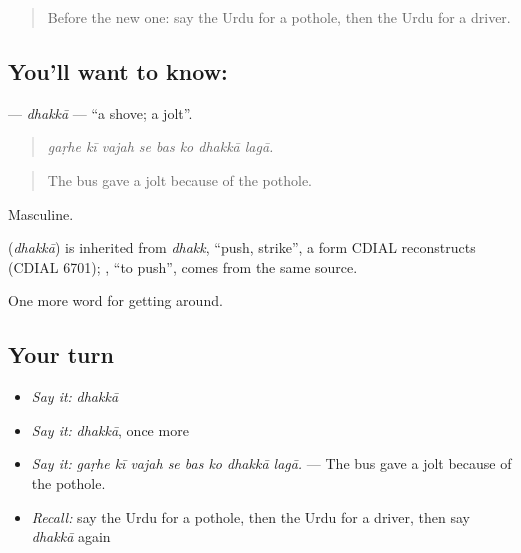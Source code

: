 \begin{quote}
Before the new one: say the Urdu for a pothole, then the Urdu for a driver.
\end{quote}

\subsection*{You'll want to know: }
\textbf{} — \emph{dhakkā} — \textquotedblleft{}a shove; a jolt\textquotedblright{}.

\begin{quote}
       
\end{quote}

\begin{quote}
\emph{gaṛhe kī vajah se bas ko dhakkā lagā.}
\end{quote}

\begin{quote}
The bus gave a jolt because of the pothole.
\end{quote}

Masculine.

\begin{cousinweb}
\textbf{} (\emph{dhakkā}) is inherited from \emph{dhakk}, \textquotedblleft{}push, strike\textquotedblright{}, a form CDIAL reconstructs (CDIAL 6701); \textbf{}, \textquotedblleft{}to push\textquotedblright{}, comes from the same source.
\end{cousinweb}

\begin{grammarlens}[title={What you've built}]
One more word for getting around.
\end{grammarlens}

\subsection*{Your turn}
\begin{itemize}
\raggedright
  \item \emph{Say it:} \emph{dhakkā}
  \item \emph{Say it:} \emph{dhakkā}, once more
  \item \emph{Say it:} \emph{gaṛhe kī vajah se bas ko dhakkā lagā.} — The bus gave a jolt because of the pothole.
  \item \emph{Recall:} say the Urdu for a pothole, then the Urdu for a driver, then say \emph{dhakkā} again
\end{itemize}

